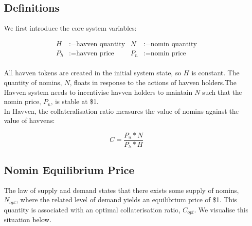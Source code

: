\newpage

\subsection{Definitions}

\noindent We first introduce the core system variables:

\begin{align*}
H &:= \text{havven quantity} & N &:= \text{nomin quantity} \\
P_h &:= \text{havven price}  & P_n &:= \text{nomin price} \\
\end{align*}

\noindent All havven tokens are created in the initial system state, so $H$ is constant. The quantity of nomins, $N$, floats in response to the actions of havven holders.The Havven system needs to incentivise havven holders to maintain $N$ such that the nomin price, $P_n$, is stable at \$1.\\

\noindent In Havven, the collateralisation ratio measures the value of nomins against the value of havvens:

$$ C = \frac{P_n * N}{P_h * H} $$

\subsection{Nomin Equilibrium Price} The law of supply and demand states that there exists some supply of nomins, $N_{opt}$, where the related level of demand yields an equilibrium price of \$1. This quantity is associated with an optimal collaterisation ratio, $C_{opt}$. We visualise this situation below. \\

\begin{center}
\end{center}

